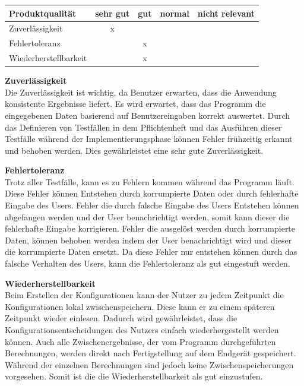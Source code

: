 \documentclass[parskip=full]{scrartcl} %
\begin{document}
    \begin{tabular}{|l| c| c| c| c|}
    \hline
        Produktqualität & sehr gut & gut & normal & nicht relevant \\
    \hline
        Zuverlässigkeit & x & & &\\
    \hline
        Fehlertoleranz & & x & &\\
    \hline
        Wiederherstellbarkeit & & x & &\\
    \hline
     \end{tabular}

\textbf{Zuverlässigkeit\\}
Die Zuverlässigkeit ist wichtig, da Benutzer erwarten, dass die Anwendung konsistente Ergebnisse liefert.
Es wird erwartet, dass das Programm die eingegebenen Daten basierend auf Benutzereingaben korrekt auswertet.
Durch das Definieren von Testfällen in dem Pflichtenheft und das Ausführen dieser Testfälle während der Implementierungsphase können Fehler frühzeitig erkannt und behoben werden.
Dies gewährleistet eine sehr gute Zuverlässigkeit.

\textbf{Fehlertoleranz\\}
Trotz aller Testfälle, kann es zu Fehlern kommen während das Programm läuft. Diese Fehler können Entstehen durch korrumpierte Daten oder durch fehlerhafte Eingabe des Users.
Fehler die durch falsche Eingabe des Users Entstehen können abgefangen werden und der User benachrichtigt werden, somit kann dieser die fehlerhafte Eingabe korrigieren.
Fehler die ausgelöst werden durch korrumpierte Daten, können behoben werden indem der User benachrichtigt wird und dieser die korrumpierte Daten ersetzt.
Da diese Fehler nur entstehen können durch das falsche Verhalten des Users, kann 
die Fehlertoleranz als gut eingestuft werden.

\textbf{Wiederherstellbarkeit\\}
Beim Erstellen der Konfigurationen kann der Nutzer zu jedem Zeitpunkt die Konfigurationen lokal zwischenspeichern. Diese kann er zu einem späteren Zeitpunkt wieder einlesen. Dadurch wird gewährleistet, dass die Konfigurationsentscheidungen des Nutzers einfach wiederhergestellt werden können.
Auch alle Zwischenergebnisse, der vom Programm durchgeführten Berechnungen, werden direkt nach Fertigstellung auf dem Endgerät gespeichert. Während der einzelnen Berechnungen sind jedoch keine Zwischenspeicherungen vorgesehen.
Somit ist die die Wiederherstellbarkeit als gut einzustufen.


\newpage 
\end{document}
